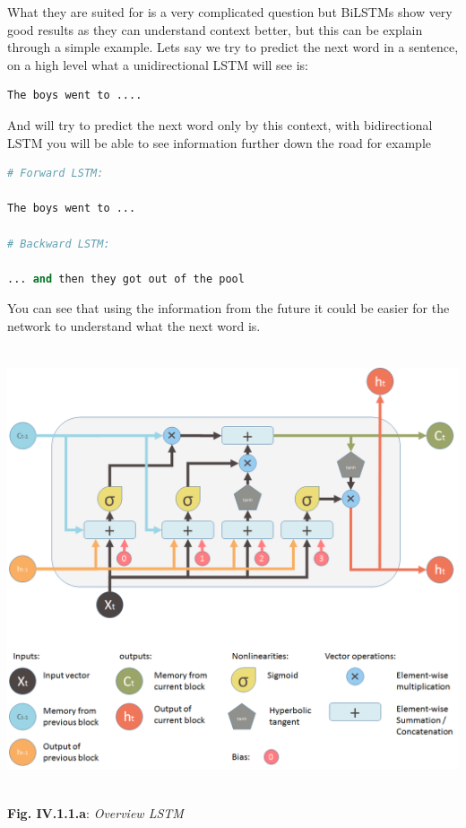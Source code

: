 \documentclass[11pt, a4papper]{report}
\theoremstyle{plain}
\theoremstyle{definition}
\theoremstyle{definition}
\theoremstyle{proposition}
\begin{document}
What they are suited for is a very complicated question but BiLSTMs show very good results as they can understand context better, but this can be explain through a simple example. Lets say we try to predict the next word in a sentence, on a high level what a unidirectional LSTM will see is:
\vspace{0.5cm}
\begin{lstlisting}[language=Python]
The boys went to ....
\end{lstlisting}
\vspace{0.5cm}

And will try to predict the next word only by this context, with bidirectional LSTM you will be able to see information further down the road for example

\vspace{0.5cm}

\begin{lstlisting}[language=Python]
# Forward LSTM:

The boys went to ...

# Backward LSTM:

... and then they got out of the pool
\end{lstlisting}
\vspace{0.5cm}

You can see that using the information from the future it could be easier for the network to understand what the next word is. 

\begin{center}
\includegraphics[width=16cm,height=13cm,keepaspectratio]{LSTM.png}
\end{center}
\begin{center}
\textbf{Fig. IV.1.1.a}: \textit{Overview LSTM}
\end{center}
\end{document}

